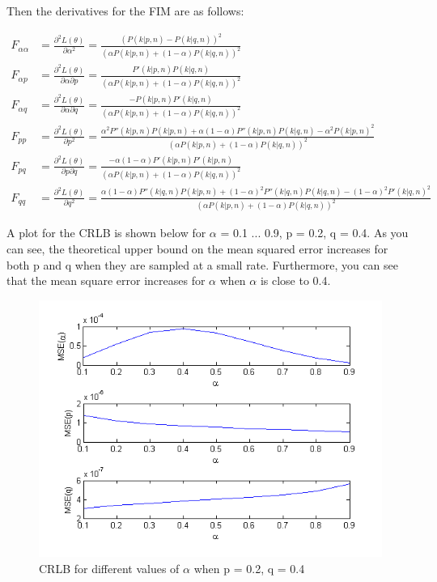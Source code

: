 Then the derivatives for the FIM are as follows:

\begin{align*}
F_{\alpha\alpha} &= \frac{\partial^2L(\mathbb{\theta})}{\partial\alpha^2} = \frac{(P(k | p, n) - P(k | q, n))^2}{(\alpha P(k | p, n) + (1 - \alpha) P(k | q, n))^2} \\
F_{\alpha p} &= \frac{\partial^2L(\mathbb{\theta})}{\partial\alpha\partial p} = \frac{P'(k | p, n)P(k | q, n)}{(\alpha P(k | p, n) + (1 - \alpha) P(k | q, n))^2} \\
F_{\alpha q} &= \frac{\partial^2L(\mathbb{\theta})}{\partial\alpha\partial q} = \frac{-P(k | p, n)P'(k | q, n)}{(\alpha P(k | p, n) + (1 - \alpha) P(k | q, n))^2} \\
F_{pp} &= \frac{\partial^2L(\mathbb{\theta})}{\partial p^2} = \frac{\alpha^2P''(k | p, n)P(k | p, n) + \alpha(1 - \alpha)P''(k | p, n)P(k | q, n) - \alpha^2P(k | p, n)^2}{(\alpha P(k | p, n) + (1 - \alpha) P(k | q, n))^2} \\
F_{pq} &= \frac{\partial^2L(\mathbb{\theta})}{\partial p\partial q} = \frac{-\alpha(1 - \alpha)P'(k | p, n)P'(k | p, n)}{(\alpha P(k | p, n) + (1 - \alpha) P(k | q, n))^2} \\
F_{qq} &= \frac{\partial^2L(\mathbb{\theta})}{\partial q^2} = \frac{\alpha(1 - \alpha)P''(k | q, n)P(k | p, n) + (1 - \alpha)^2P''(k | q, n)P(k | q, n) - (1 - \alpha)^2P'(k | q, n)^2}{(\alpha P(k | p, n) + (1 - \alpha) P(k | q, n))^2}
\end{align*}


A plot for the CRLB is shown below for $\alpha$ = 0.1 ... 0.9, p = 0.2, q = 0.4. As you can see, the theoretical upper bound on the mean squared error increases for both p and q when they are sampled at a small rate. Furthermore, you can see that the mean square error increases for $\alpha$ when $\alpha$ is close to 0.4.

\begin{figure}[!htbp]
	\centering
	\includegraphics[width=\columnwidth]{images/crlb1.png} %
	\vspace{-1pt}
	\caption{CRLB for different values of $\alpha$ when p = 0.2, q = 0.4}
	\vspace{-2pt}
	\label{figure:crlb}
\end{figure}

